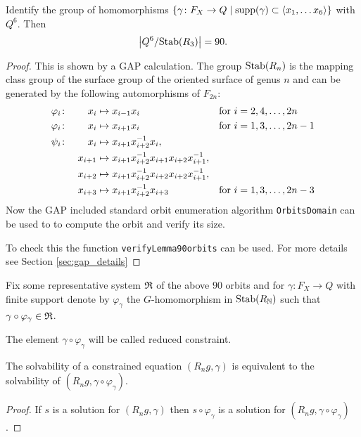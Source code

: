\documentclass[a4paper,11pt]{amsart}
\begin{document}
\begin{lem}
 Identify the group of homomorphisms $\{\gamma \colon F_X \to Q \mid \textup{supp}(\gamma) \subset \left<x_1,\ldots x_6\right>\}$ with $Q^6$. 
 Then \[\left|{Q^6/\textup{Stab}(R_3)}\right|=90.\]
\end{lem}
\begin{proof}
 This is shown by a GAP calculation. The group $\textup{Stab}(R_n)$ is the mapping class group
 of the surface group of the oriented surface of genus $n$ and can be generated by the 
 following automorphisms of $F_{2n}$:
 \begin{align*}
  \varphi_i&\colon& x_i&\mapsto x_{i-1}x_i & \textup{for }&i=2,4,\ldots,2n \\
  \varphi_i&\colon&x_i&\mapsto x_{i+1}x_i & \textup{for }&i=1,3,\ldots,2n-1 \\
  \psi_i&\colon&x_i&\mapsto x_{i+1}x_{i+2}^{-1}x_i, && \\  
  &&x_{i+1}&\mapsto x_{i+1}x_{i+2}^{-1}x_{i+1}x_{i+2}x_{i+1}^{-1}, && \\  
  &&x_{i+2}&\mapsto x_{i+1}x_{i+2}^{-1}x_{i+2}x_{i+2}x_{i+1}^{-1}, && \\  
  &&x_{i+3}&\mapsto x_{i+1}x_{i+2}^{-1}x_{i+3}& \textup{for }&i=1,3,\ldots,2n-3   
 \end{align*}
 Now the GAP included standard orbit enumeration algorithm \lstinline{OrbitsDomain} can be used to 
 to compute the orbit and verify its size. 
 
 To check this the function \lstinline{verifyLemma90orbits}
 can be used. For more details see Section \ref{sec:gap_details}
\end{proof}
\begin{defi}
 Fix some representative system $\mathfrak{R}$ of the above $90$ orbits and for 
 $\gamma \colon F_X \to Q$ with finite support denote by $\varphi_\gamma$ the $G$-homomorphism in $\textup{Stab}(R_{\mathbb{N}})$ such that $\gamma\circ \varphi_\gamma \in \mathfrak{R}$.
 
 The element $\gamma \circ \varphi_\gamma$ will be called reduced constraint.
\end{defi}

\begin{lem} \label{lem:solvabilityWithReducedConstraint}
 The solvability of a constrained equation $(R_n g,\gamma)$ is equivalent to the solvability of $(R_n g,\gamma\circ \varphi_\gamma)$.
\end{lem}
 \begin{proof}
 If $s$ is a solution for $(R_n g,\gamma)$ then $s\circ \varphi_\gamma$ is
 a solution for $(R_n g,\gamma\circ \varphi_\gamma)$. 
\end{proof}
\end{document}
